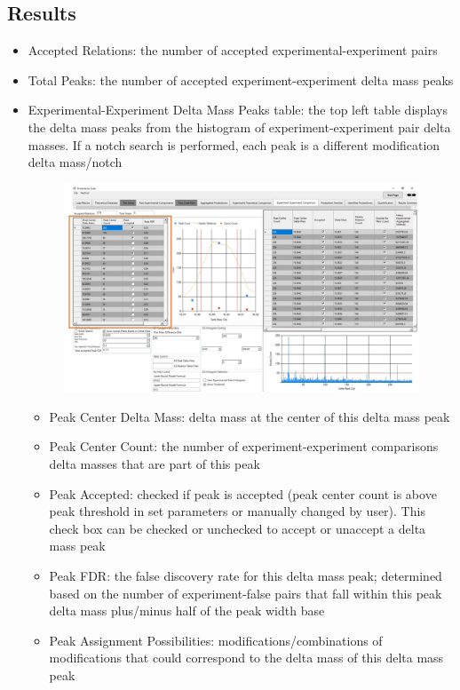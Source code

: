 \subsection{Results}
\begin{itemize}
	\item Accepted Relations: the number of accepted experimental-experiment pairs
	\item Total Peaks: the number of accepted experiment-experiment delta mass peaks
	\item Experimental-Experiment Delta Mass Peaks table: the top left table displays the delta mass peaks from the histogram of experiment-experiment pair delta masses. If a notch search is performed, each peak is a different modification delta mass/notch
	\begin{figure}[h]
\centering
\includegraphics[scale=0.43]{figures/ee2.jpg}
\end{figure}
	\begin{itemize}
		\item Peak Center Delta Mass: delta mass at the center of this delta mass peak 
		\item Peak Center Count: the number of experiment-experiment comparisons delta masses that are part of this peak
		\item Peak Accepted: checked if peak is accepted (peak center count is above peak threshold in set parameters or manually changed by user). This check box can be checked or unchecked to accept or unaccept a delta mass peak
		\item Peak FDR: the false discovery rate for this delta mass peak; determined based on the number of experiment-false pairs that fall within this peak delta mass plus/minus half of the peak width base
		\item Peak Assignment Possibilities: modifications/combinations of modifications that could correspond to the delta mass of this delta mass peak

\end{itemize}
\end{itemize}
